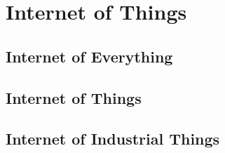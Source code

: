 \chapter{Internet of Things}
\label{cha:iot}

\section{Internet of Everything}

\section{Internet of Things}

\section{Internet of Industrial Things}




